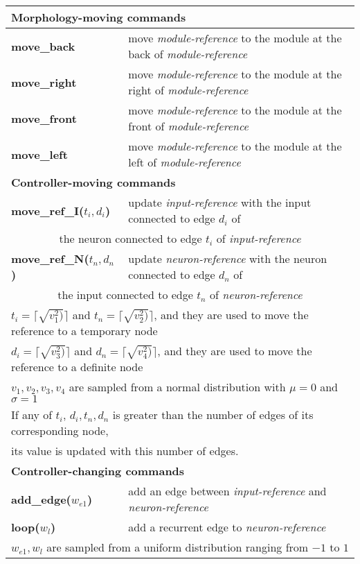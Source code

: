 \documentclass[utf8]{frontiersSCNS} %
\begin{document}
\begin{table}[t]
\begin{tabular}{|l|l|}
\multicolumn{2}{l}{\textbf{Morphology-moving commands}} \\ \hline 
\textbf{move\_back}  & move \textit{module-reference} to the module at the back of \textit{module-reference}  \\ \hline
\textbf{move\_right}  & move \textit{module-reference} to the module at the right of \textit{module-reference}     \\ \hline
\textbf{move\_front}  & move \textit{module-reference} to the module at the front of \textit{module-reference}    \\ \hline
\textbf{move\_left}  & move \textit{module-reference} to the module at the left of \textit{module-reference}   \\

\hline
\multicolumn{2}{l}{\textbf{Controller-moving commands}} \\ \hline 
\textbf{move\_ref\_I($t_i, d_i$)}   &  update \textit{input-reference} with the input connected to edge $d_i$ of \\    \multicolumn{2}{c}{ the neuron connected to edge $t_i$ of \textit{input-reference} }  \\ \hline
\textbf{move\_ref\_N($t_n, d_n$)}   &  update \textit{neuron-reference} with the neuron connected to edge $d_n$ of \\    \multicolumn{2}{c}{ the input connected to edge $t_n$ of \textit{neuron-reference} }  \\ \hline
 
   \multicolumn{2}{l}{
  $t_i = \lceil\sqrt{v_1^2)}\rceil $ and $t_n = \lceil\sqrt{v_2^2)}\rceil $, and they are used to move the reference to a temporary node} \\ 
 \multicolumn{2}{l}{ $d_i = \lceil\sqrt{v_3^2)}\rceil $ and $d_n = \lceil\sqrt{v_4^2)}\rceil $, and they are used to move the reference to a definite node} \\  
    \multicolumn{2}{l}{ $v_1, v_2, v_3, v_4$ are sampled from a normal distribution with $\mu=0$ and $\sigma=1$ } \\
 
  \multicolumn{2}{l}{ If any of $t_i$, $d_i, t_n, d_n$ is greater than the number of edges of its corresponding node,} \\
   \multicolumn{2}{l}{its value is updated with this number of edges.  }  \\ \hline
 
\multicolumn{2}{l}{\textbf{Controller-changing commands}} \\ \hline 
\textbf{add\_edge($w_{e1}$)}   &  add an edge  between \textit{input-reference} and \textit{neuron-reference}  \\ \hline
\textbf{loop($w_l$)}   &  add a recurrent edge to \textit{neuron-reference} \\ \hline
   \multicolumn{2}{l}{ $w_{e1}, w_l$   are sampled from a uniform distribution ranging from $-1$ to $1$ } \\ \hline
   

\end{tabular}
\end{table}
\end{document}
